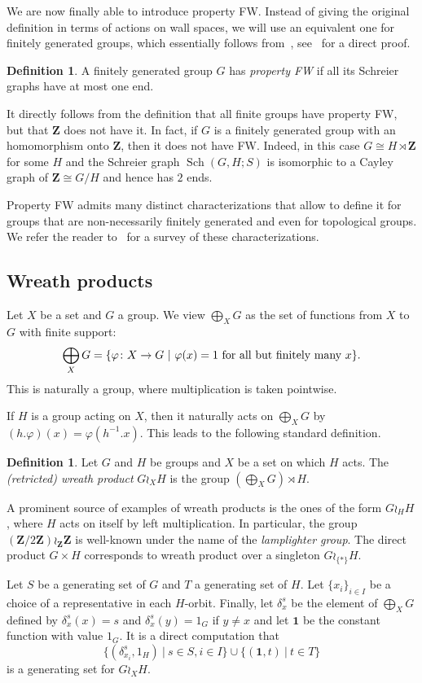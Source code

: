 \documentclass[a4paper]{article}
\theoremstyle{definition}
\newtheorem{defn}[lem]{Definition}
\theoremstyle{remark}
\DeclareMathOperator\Sch{Sch}
\newcommand*{\field}[1]{\mathbf{#1}}
\newcommand*{\Z}{\field{Z}}
\newcommand{\setst}[2]{\{#1\ |\ #2\}}
\begin{document}
We are now finally able to introduce property FW. Instead of giving the original definition in terms of actions on wall spaces, we will use an equivalent one for finitely generated groups, which essentially follows from~\cite{MR1347406}, see~\cite{Cornulier2013} for a direct proof.
%
%
\begin{defn}
A finitely generated group $G$ has \emph{property FW} if all its Schreier graphs have at most one end.
\end{defn}
%
%
It directly follows from the definition that all finite groups have property FW, but that $\Z$ does not have it.
In fact, if $G$ is a finitely generated group with an homomorphism onto $\Z$, then it does not have FW. Indeed, in this case $G\cong H\rtimes \Z$  for some $H$ and the Schreier graph $\Sch(G,H;S)$ is isomorphic to a Cayley graph of $\Z\cong G/H$ and hence has $2$ ends.

Property FW admits many distinct characterizations that allow to define it for groups that are non-necessarily finitely generated and even for topological groups. We refer the reader to~\cite{Cornulier2013} for a survey of these characterizations.

\subsection{Wreath products}
%
%
Let $X$ be a set and $G$ a group. We view
$\bigoplus_XG$ as the set of functions from $X$ to $G$ with finite support:
\[
	\bigoplus_XG=\setst{\varphi\colon X\to G}{\varphi(x)=1 \textnormal{ for all but finitely many }x}.
\]
This is naturally a group, where multiplication is taken pointwise.

If $H$ is a group acting on $X$, then it naturally acts on $\bigoplus_XG$
by $(h.\varphi)(x)=\varphi(h^{-1}.x)$.
This leads to the following standard definition.
\begin{defn}\label{Def:WreathProd}
Let $G$ and $H$ be groups and $X$ be a set on which $H$ acts.
The \emph{(retricted) wreath product} $G\wr_XH$ is the group $(\bigoplus_XG)\rtimes H$.
\end{defn}
A prominent  source of examples of wreath products is the ones of the form $G\wr_HH$, where $H$ acts on itself by left multiplication.
In particular, the group $(\Z/2\Z)\wr_\Z\Z$ is well-known under the name of the \emph{lamplighter group}.
The direct product $G\times H$ corresponds to wreath product over a singleton $G\wr_{\{*\}}H$.

Let $S$ be a generating set of $G$ and $T$ a generating set of $H$.
Let $\{x_i\}_{i\in I}$ be a choice of a representative in each $H$-orbit.
Finally, let $\delta_x^s$ be the element of $\bigoplus_XG$ defined by $\delta_x^s(x)=s$ and $\delta_x^s(y)=1_G$ if $y\neq x$ and let $\mathbf 1$ be the constant function with value $1_G$.
It is a direct computation that
\[
	\setst{(\delta_{x_i}^s,1_H)}{s \in S,i\in I} \cup \setst{(\mathbf 1,t)}{t \in T}
\]
is a generating set for $G\wr_XH$.
\end{document}
